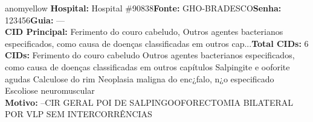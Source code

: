 \documentclass[a4paper,10pt]{article}
\begin{document}
\begin{anomalycard}[Interna\c{c}\~{a}o \#119664 | Pac. \#99240 | MODERADO (z=2.19) | LOS: 1d | 04/03/2026\,$\to$\,05/03/2026]{anomyellow}
\textbf{Hospital:} Hospital \#90838\quad \textbf{Fonte:} GHO-BRADESCO\quad \textbf{Senha:} 123456\quad \textbf{Guia:} ---\\

\textbf{CID Principal:} {\small Ferimento do couro cabeludo, Outros agentes bacterianos especificados, como causa de doenças classificadas em outros cap...}\quad\textbf{Total CIDs:} 6\\

\textbf{CIDs:} {\scriptsize Ferimento do couro cabeludo \textbar{} Outros agentes bacterianos especificados, como causa de doenças classificadas em outros capítulos \textbar{} Salpingite e ooforite agudas \textbar{} Calculose do rim \textbar{} Neoplasia maligna do enc¿falo, n¿o especificado \textbar{} Escoliose neuromuscular}\\

\textbf{Motivo:} {\scriptsize --CIR GERAL   POI DE SALPINGOOFORECTOMIA BILATERAL POR VLP SEM INTERCORRÊNCIAS}\\



\end{anomalycard}
\end{document}
